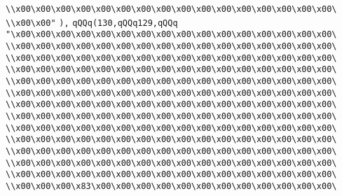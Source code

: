 \verb|\\x00\x00\x00\x00\x00\x00\x00\x00\x00\x00\x00\x00\x00\x00\x00\x00\|\newline
\verb|\\x00\x00"|\newline
\verb|),|\newline
\verb|qQQq(130,qQQq129,qQQq|\newline
\verb|"\x00\x00\x00\x00\x00\x00\x00\x00\x00\x00\x00\x00\x00\x00\x00\x00\|\newline
\verb|\\x00\x00\x00\x00\x00\x00\x00\x00\x00\x00\x00\x00\x00\x00\x00\x00\|\newline
\verb|\\x00\x00\x00\x00\x00\x00\x00\x00\x00\x00\x00\x00\x00\x00\x00\x00\|\newline
\verb|\\x00\x00\x00\x00\x00\x00\x00\x00\x00\x00\x00\x00\x00\x00\x00\x00\|\newline
\verb|\\x00\x00\x00\x00\x00\x00\x00\x00\x00\x00\x00\x00\x00\x00\x00\x00\|\newline
\verb|\\x00\x00\x00\x00\x00\x00\x00\x00\x00\x00\x00\x00\x00\x00\x00\x00\|\newline
\verb|\\x00\x00\x00\x00\x00\x00\x00\x00\x00\x00\x00\x00\x00\x00\x00\x00\|\newline
\verb|\\x00\x00\x00\x00\x00\x00\x00\x00\x00\x00\x00\x00\x00\x00\x00\x00\|\newline
\verb|\\x00\x00\x00\x00\x00\x00\x00\x00\x00\x00\x00\x00\x00\x00\x00\x00\|\newline
\verb|\\x00\x00\x00\x00\x00\x00\x00\x00\x00\x00\x00\x00\x00\x00\x00\x00\|\newline
\verb|\\x00\x00\x00\x00\x00\x00\x00\x00\x00\x00\x00\x00\x00\x00\x00\x00\|\newline
\verb|\\x00\x00\x00\x00\x00\x00\x00\x00\x00\x00\x00\x00\x00\x00\x00\x00\|\newline
\verb|\\x00\x00\x00\x00\x00\x00\x00\x00\x00\x00\x00\x00\x00\x00\x00\x00\|\newline
\verb|\\x00\x00\x00\x83\x00\x00\x00\x00\x00\x00\x00\x00\x00\x00\x00\x00\|\newline
